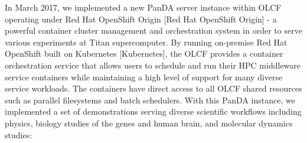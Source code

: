 In March 2017, we implemented a new PanDA server instance within OLCF operating
under Red Hat OpenShift Origin [Red Hat OpenShift Origin] - a powerful
container cluster management and orchestration system in order to serve various
experiments at Titan supercomputer. By running on-premise Red Hat OpenShift
built on Kubernetes [Kubernetes], the OLCF provides a container orchestration
service that allows users to schedule and run their HPC middleware service
containers while maintaining a high level of support for many diverse service
workloads. The containers have direct access to all OLCF shared resources such
as parallel filesystems and batch schedulers. With this PanDA instance, we
implemented a set of demonstrations serving diverse scientific workflows
including physics, biology studies of the genes and human brain, and molecular
dynamics studies:


